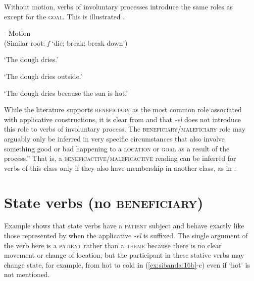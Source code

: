 \documentclass[output=paper]{langsci/langscibook}
\begin{document}
 Without motion, verbs of involuntary processes introduce the same roles as  except for the \textsc{goal.} This is illustrated .

\ea\label{ex:sibanda:15}
\settowidth{}
{- Motion} \\
 (Similar root: \textit{f} ‘die; break; break down’)\\

\glt ‘The dough dries.’



\glt ‘The dough dries outside.’


\glt ‘The dough dries because the sun is hot.’ 
\z
\z

While the literature supports \textsc{beneficiary} as the most common role associated with applicative constructions, it is clear from  and  that \textit{-el} does not introduce this role to verbs of involuntary process. The \textsc{beneficiary}/\textsc{maleficiary} role may arguably only be inferred in very specific circumstances that also involve something good or bad happening to a \textsc{location} or \textsc{goal} as a result of the process.” That is, a \textsc{beneficactive}/\textsc{maleficactive} reading can be inferred for verbs of this class only if they also have membership in another class, as in .

\section{State verbs (no \textsc{beneficiary)}}\label{sec:sibanda:}

Example  shows that state verbs have a \textsc{patient} subject and behave exactly like those represented by  when the applicative \textit{-el} is suffixed. The single argument of the verb here is a \textsc{patient} rather than a \textsc{theme} because there is no clear movement or change of location, but the participant in these stative verbs may change state, for example, from hot to cold in (\ref{ex:sibanda:16b}-c) even if ‘hot’ is not mentioned. 
\end{document}
